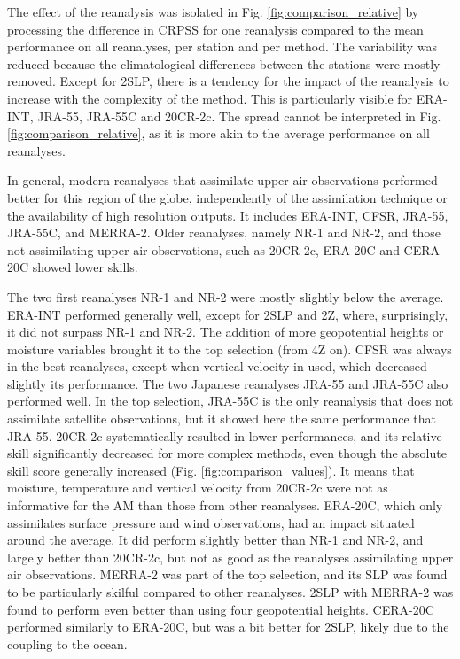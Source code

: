 \documentclass{ametsoc}
\begin{document}
The effect of the reanalysis was isolated in Fig. \ref{fig:comparison_relative} by processing the difference in CRPSS for one reanalysis compared to the mean performance on all reanalyses, per station and per method. The variability was reduced because the climatological differences between the stations were mostly removed. Except for 2SLP, there is a tendency for the impact of the reanalysis to increase with the complexity of the method. This is particularly visible for ERA-INT, JRA-55, JRA-55C and 20CR-2c. The spread cannot be interpreted in Fig. \ref{fig:comparison_relative}, as it is more akin to the average performance on all reanalyses.

In general, modern reanalyses that assimilate upper air observations performed better for this region of the globe, independently of the assimilation technique or the availability of high resolution outputs. It includes ERA-INT, CFSR, JRA-55, JRA-55C, and MERRA-2. Older reanalyses, namely NR-1 and NR-2, and those not assimilating upper air observations, such as 20CR-2c, ERA-20C and CERA-20C showed lower skills.

The two first reanalyses NR-1 and NR-2 were mostly slightly below the average. ERA-INT performed generally well, except for 2SLP and 2Z, where, surprisingly, it did not surpass NR-1 and NR-2. The addition of more geopotential heights or moisture variables brought it to the top selection (from 4Z on). CFSR was always in the best reanalyses, except when vertical velocity in used, which decreased slightly its performance. The two Japanese reanalyses JRA-55 and JRA-55C also performed well. In the top selection, JRA-55C is the only reanalysis that does not assimilate satellite observations, but it showed here the same performance that JRA-55. 20CR-2c systematically resulted in lower performances, and its relative skill significantly decreased for more complex methods, even though the absolute skill score generally increased (Fig. \ref{fig:comparison_values}). It means that moisture, temperature and vertical velocity from 20CR-2c were not as informative for the AM than those from other reanalyses. ERA-20C, which only assimilates surface pressure and wind observations, had an impact situated around the average. It did perform slightly better than NR-1 and NR-2, and largely better than 20CR-2c, but not as good as the reanalyses assimilating upper air observations. MERRA-2 was part of the top selection, and its SLP was found to be particularly skilful compared to other reanalyses. 2SLP with MERRA-2 was found to perform even better than using four geopotential heights. CERA-20C performed similarly to ERA-20C, but was a bit better for 2SLP, likely due to the coupling to the ocean.
\end{document}
